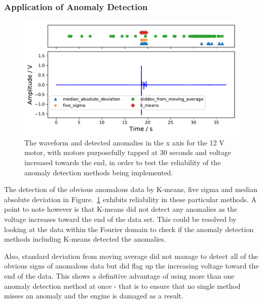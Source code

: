 \subsubsection{Application of Anomaly Detection}

\begin{figure}[t]
    \includegraphics[width=1.0\textwidth]{fig/specific_anomaly_test1_motornorm12V.pdf}
    \caption[Specific Anomaly Test]{The waveform and detected anomalies in the x axis for the 12 V motor, with motors purposefully tapped at 30 seconds and voltage increased towards the end, in order to test the reliability of the anomaly detection methods being implemented.}
    \label{fig:spec_anom1}
\end{figure}

The detection of the obvious anomalous data by K-means, five sigma and median absolute deviation in Figure.~\ref{fig:spec_anom1} exhibits reliability in these particular methods. A point to note however is that K-means did not detect any anomalies as the voltage increases toward the end of the data set. This could be resolved by looking at the data within the Fourier domain to check if the anomaly detection methods including K-means detected the anomalies. 

Also, standard deviation from moving average did not manage to detect all of the obvious signs of anomalous data but did flag up the increasing voltage toward the end of the data. This shows a definitive advantage of using more than one anomaly detection method at once - that is to ensure that no single method misses an anomaly and the engine is damaged as a result.


